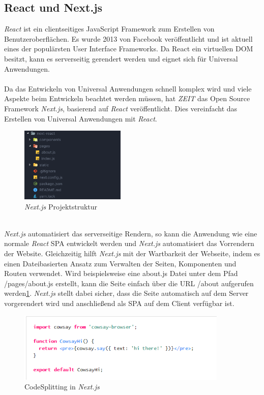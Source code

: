 \documentclass[runningheads]{llncs}
\numberwithin{figure}{section}
\begin{document}
\subsection{React und Next.js}
\label{subsec:React und Next.js}
\textit{React} ist ein clientseitiges JavaScript Framework zum Erstellen von Benutzeroberflächen. 
Es wurde 2013 von Facebook veröffentlicht und ist aktuell eines der populärsten User Interface Frameworks. 
Da React ein virtuellen DOM besitzt, 
kann es serverseitig gerendert werden und eignet sich für Universal Anwendungen.
\\
\\
Da das Entwickeln von Universal Anwendungen schnell komplex wird und 
viele Aspekte beim Entwickeln beachtet werden müssen, 
hat \textit{ZEIT} das Open Source Framework \textit{Next.js}, 
basierend auf \textit{React} veröffentlicht. 
Dies vereinfacht das Erstellen von Universal Anwendungen mit \textit{React}.
\begin{figure}
  \centering
  \includegraphics[width=5cm]{images/nextprojectStructure}
  \caption{\textit{Next.js} Projektstruktur\cite{arunoda}}
  \label{Next.js Projektstruktur}
\end{figure}
\\
\textit{Next.js} automatisiert das serverseitige Rendern, 
so kann die Anwendung wie eine normale \textit{React} SPA entwickelt werden und 
\textit{Next.js} automatisiert das Vorrendern der Website. 
Gleichzeitig hilft \textit{Next.js} mit der Wartbarkeit der Webseite, 
indem es einen Dateibasierten Ansatz zum Verwalten der Seiten, 
Komponenten und Routen verwendet. 
Wird beispielsweise eine about.js Datei unter dem Pfad /pages/about.js erstellt, 
kann die Seite einfach über die URL /about aufgerufen werden\ref{Next.js Projektstruktur}. 
\textit{Next.js} stellt dabei sicher, 
dass die Seite automatisch auf dem Server vorgerendert wird und 
anschließend als SPA auf dem Client verfügbar ist. 
\begin{figure}
  \centering
  \includegraphics[width=10cm]{images/CodeSplitting}
  \caption{CodeSplitting in \textit{Next.js} \cite{arunoda}}
  \label{CodeSplitting in Next.js}
\end{figure}
\end{document}
